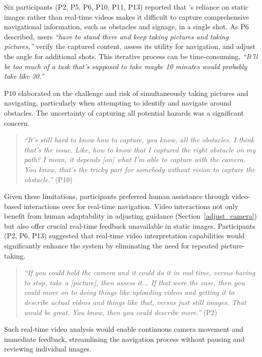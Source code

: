 Six participants (P2, P5, P6, P10, P11, P13) reported that \sbma's reliance on static images rather than real-time videos makes it difficult to capture comprehensive navigational information, such as obstacles and signage, in a single shot. 
% 
As P6 described, users \textit{``have to stand there and keep taking pictures and taking pictures,''} verify the captured content, assess its utility for navigation, and adjust the angle for additional shots. This iterative process can be time-consuming, \textit{``It'll be too much of a task that's supposed to take maybe 10 minutes would probably take like 30.''}



P10 elaborated on the challenge and risk of simultaneously taking pictures and navigating, particularly when attempting to identify and navigate around obstacles. The uncertainty of capturing all potential hazards was a significant concern. 



\begin{quote}
    \textit{``It's still hard to know how to capture, you know, all the obstacles. I think that's the issue. Like, how to know that I captured the right obstacle on my path? I mean, it depends [on] what I'm able to capture with the camera. You know, that's the tricky part for somebody without vision to capture the obstacle.''} (P10)
\end{quote}


Given these limitations, participants preferred human assistance through video-based interactions over \bma{} for real-time navigation. 
Video interactions not only benefit from human adaptability in adjusting guidance (Section~\ref{adjust_camera}) but also offer crucial real-time feedback unavailable in static images. 
Participants (P2, P6, P13) suggested that real-time video interpretation capabilities would significantly enhance the system by eliminating the need for repeated picture-taking. 



\begin{quote}
    \textit{``If you could hold the camera and it could do it in real time, versus having to stop, take a [picture], then assess it... If that were the case, then you could move on to doing things like uploading videos and getting it to describe actual videos and things like that, versus just still images. That would be great. You know, then you could describe more.''} (P2)
\end{quote}
% 
Such real-time video analysis would enable continuous camera movement and immediate feedback, streamlining the navigation process without pausing and reviewing individual images. 



